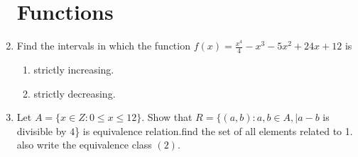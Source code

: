 \documentclass[10pt,-letter paper]{article}
\providecommand{\brak}[1]{\ensuremath{\left(#1\right)}}
\begin{document}
\begin{enumerate}
\section{Functions}
\item Find the intervals in which the function $f\brak{x}=\frac{x^4}{4}-x^{3}-5x^{2}+24x+12 $ is 
\begin{enumerate}
  \item strictly increasing.
 \item strictly decreasing.
\end{enumerate}
 \item Let $A=\{x \in Z : 0 \leq x \leq 12\}$. Show that $R=\{\brak{a,b}: a,b \in A,\vert{a-b}$ is divisible by $4$\} is equivalence relation.find the set of all elements related to 1. also write the equivalence class $\brak{2}$.


\end{enumerate}
\end{document}
